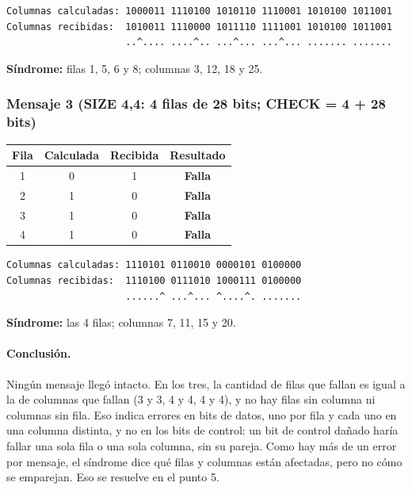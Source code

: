 \documentclass[11pt,a4paper]{article}
\begin{document}
\begin{verbatim}
Columnas calculadas: 1000011 1110100 1010110 1110001 1010100 1011001
Columnas recibidas:  1010011 1110000 1011110 1111001 1010100 1011001
                     ..^.... ....^.. ...^... ...^... ....... .......
\end{verbatim}

\noindent\textbf{Síndrome:} filas 1, 5, 6 y 8; columnas 3, 12, 18 y 25.

\subsubsection*{Mensaje 3 (SIZE 4,4: 4 filas de 28 bits; CHECK = 4 + 28 bits)}

\begin{center}
\begin{tabular}{|c|c|c|c|}
\hline
\textbf{Fila} & \textbf{Calculada} & \textbf{Recibida} & \textbf{Resultado} \\
\hline
1 & 0 & 1 & \textbf{Falla} \\
2 & 1 & 0 & \textbf{Falla} \\
3 & 1 & 0 & \textbf{Falla} \\
4 & 1 & 0 & \textbf{Falla} \\
\hline
\end{tabular}
\end{center}

\begin{verbatim}
Columnas calculadas: 1110101 0110010 0000101 0100000
Columnas recibidas:  1110100 0111010 1000111 0100000
                     ......^ ...^... ^....^. .......
\end{verbatim}

\noindent\textbf{Síndrome:} las 4 filas; columnas 7, 11, 15 y 20.

\paragraph{Conclusión.} Ningún mensaje llegó intacto. En los tres, la cantidad de filas que fallan es igual a la de columnas que fallan (3 y 3, 4 y 4, 4 y 4), y no hay filas sin columna ni columnas sin fila. Eso indica errores en bits de datos, uno por fila y cada uno en una columna distinta, y no en los bits de control: un bit de control dañado haría fallar una sola fila o una sola columna, sin su pareja. Como hay más de un error por mensaje, el síndrome dice qué filas y columnas están afectadas, pero no cómo se emparejan. Eso se resuelve en el punto 5.
\end{document}

